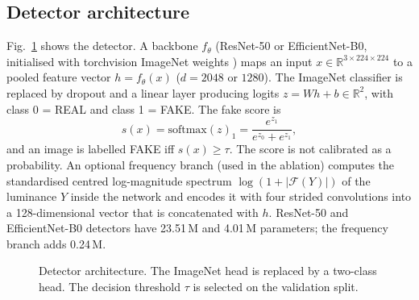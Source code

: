 \documentclass[conference]{IEEEtran}
\begin{document}
\subsection{Detector architecture}
Fig.~\ref{fig:detector} shows the detector. A backbone $f_\theta$ (ResNet-50 or EfficientNet-B0, initialised with torchvision ImageNet weights \cite{deng2009imagenet}) maps an input $x\in\mathbb{R}^{3\times224\times224}$ to a pooled feature vector $h=f_\theta(x)$ ($d=2048$ or $1280$). The ImageNet classifier is replaced by dropout and a linear layer producing logits $z=Wh+b\in\mathbb{R}^2$, with class 0 = REAL and class 1 = FAKE. The fake score is
\begin{equation}
s(x)=\mathrm{softmax}(z)_1=\frac{e^{z_1}}{e^{z_0}+e^{z_1}},
\end{equation}
and an image is labelled FAKE iff $s(x)\ge\tau$. The score is not calibrated as a probability. An optional frequency branch (used in the ablation) computes the standardised centred log-magnitude spectrum $\log(1+|\mathcal{F}(Y)|)$ of the luminance $Y$ inside the network and encodes it with four strided convolutions into a 128-dimensional vector that is concatenated with $h$. ResNet-50 and EfficientNet-B0 detectors have 23.51\,M and 4.01\,M parameters; the frequency branch adds 0.24\,M.

\begin{figure}[!t]
\centering
{}
\caption{Detector architecture. The ImageNet head is replaced by a two-class head. The decision threshold $\tau$ is selected on the validation split.}
\label{fig:detector}
\end{figure}
\end{document}
